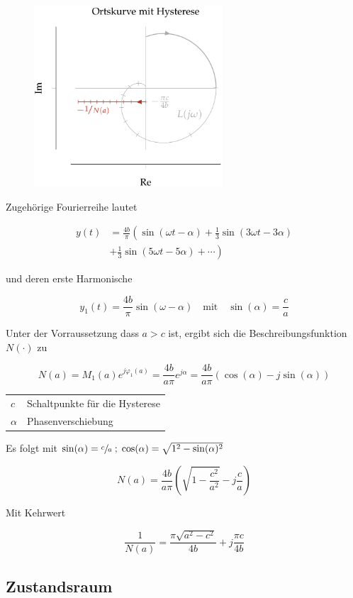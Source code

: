 \documentclass[
  10pt,
  a4paper,
  twocolumn]{article}
\makeatletter
\numberwithin{equation}{section}
\newenvironment{conditions}
  {\par\vspace{\abovedisplayskip}\noindent\begin{tabular}{>{$}l<{$} @{${}:{}$} l}}
  {\end{tabular}\par\vspace{\belowdisplayskip}}
\makeatother
\begin{document}
\begin{figure}[H]

{\centering \includegraphics[width=7cm,height=\textheight]{images/paste-51.png}

}

\end{figure}

Zugehörige Fourierreihe lautet

\[
\begin{split}
y(t) &= \frac{4b}{\pi}\left(\sin(\omega t-\alpha) + \frac1{3}\sin(3\omega t-3\alpha)\right. \\
     &+ \left.\frac1{3}\sin(5\omega t-5\alpha)+\cdots\right)
\end{split}
\]

und deren erste Harmonische

\[
y_1(t)=\frac{4b}{\pi}\sin(\omega-\alpha)\quad\text{mit}\quad \sin(\alpha)=\frac{c}{a}
\]

Unter der Vorraussetzung dass \(a > c\) ist, ergibt sich die
Beschreibungsfunktion \(N(\cdot)\) zu

\[
N(a)= M_1(a)e^{j\varphi_1(a)}=\frac{4b}{a\pi}e^{j\alpha}=\frac{4b}{a\pi}(\cos(\alpha)-j\sin(\alpha))
\]

\begin{conditions}
  c & Schaltpunkte für die Hysterese \\
  \alpha & Phasenverschiebung
\end{conditions}

Es folgt mit
\(\sin(\alpha)=\sfrac{c}{a}\;;\; \cos(\alpha)=\sqrt{1^2-\sin(\alpha)^2}\)

\[
N(a)=\frac{4b}{a\pi}\left(\sqrt{1-\frac{c^2}{a^2}}-j\frac{c}{a}\right)
\]

Mit Kehrwert

\[
\frac1{N(a)}=\frac{\pi \sqrt{a^2-c^2}}{4b}+j\frac{\pi c}{4b}
\]

\hypertarget{zustandsraum}{%
\subsection{Zustandsraum}\label{zustandsraum}}
\end{document}
